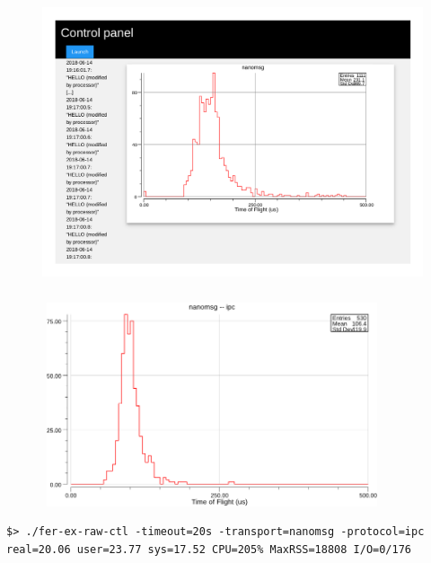 \documentclass[9pt]{beamer}
\begin{document}
\begin{frame}[fragile]
\frametitle{}


\begin{figure}[h]
\begin{center}
\includegraphics[width=12cm,height=8cm]{_figs/fer-nanomsg.png}
\end{center}

\end{figure}


\end{frame}

\begin{frame}[fragile]
\frametitle{}


\begin{figure}[h]
\begin{center}
\includegraphics[width=10cm,height=6cm]{_figs/tof-nanomsg-ipc.png}
\end{center}

\end{figure}


\begin{verbatim}
$> ./fer-ex-raw-ctl -timeout=20s -transport=nanomsg -protocol=ipc
real=20.06 user=23.77 sys=17.52 CPU=205% MaxRSS=18808 I/O=0/176

\end{verbatim}



\end{frame}
\end{document}
